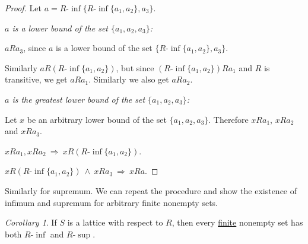 \documentclass[11pt,paper=b5,footinclude,headinclude]{scrbook} %
\def\inn {{~\wedge~}}
\def\sledi {{~\Rightarrow~}}
\theoremstyle{remark}
\newtheorem*{corollary}{Corollary}
\theoremstyle{definition} %
\theoremstyle{theorem} %
\newtheorem*{proposition}{Proposition}
\begin{document}
\begin{proof}
Let $a = R\textrm{-}\inf\{R\textrm{-}\inf\{a_1,a_2\}, a_3\}$.

\emph{ $a$ is a lower bound of the set $\{a_1,a_2,a_3\}$:}

  $aRa_3$, since $a$ is a lower bound of the set $\{R\textrm{-}\inf\{a_1,a_2\}, a_3\}$.

  Similarly
   $aR(R\textrm{-}\inf\{a_1,a_2\})$, but since $(R\textrm{-}\inf\{a_1,a_2\})Ra_1$ and $R$ is transitive, we get $aRa_1$.
   Similarly we also get $aRa_2$.


\emph{ $a$ is the greatest lower bound of the set $\{a_1,a_2,a_3\}$:}

Let $x$ be an arbitrary lower bound of the set $\{a_1,a_2,a_3\}$. Therefore $xRa_1$, $xRa_2$ and $xRa_3$.

$xRa_1, xRa_2\sledi xR(R\textrm{-}\inf\{a_1,a_2\})$.

$xR(R\textrm{-}\inf\{a_1,a_2\}) \inn xRa_3\sledi xRa$.
\end{proof}

Similarly for supremum. We can repeat the procedure and show the existence of infimum and supremum for
arbitrary finite nonempty sets.

\medskip
%

\begin{corollary}
If $S$ is a lattice with respect to $R$, then every \underline{finite} nonempty set has both $R\textrm{-}\inf$
and $R\textrm{-}\sup$.
\end{corollary}


%
%
%
%
%
%
%
%
%
%
\end{document}
